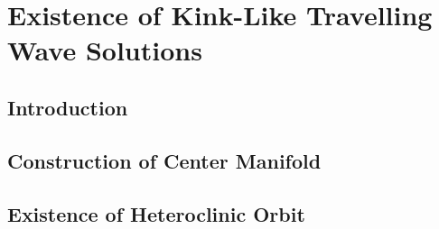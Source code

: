 \chapter{Existence of Kink-Like Travelling Wave Solutions}
\label{chp:existence}
\pagestyle{myheadings}

\section{Introduction}



\section{Construction of Center Manifold}





\section{Existence of Heteroclinic Orbit}





%